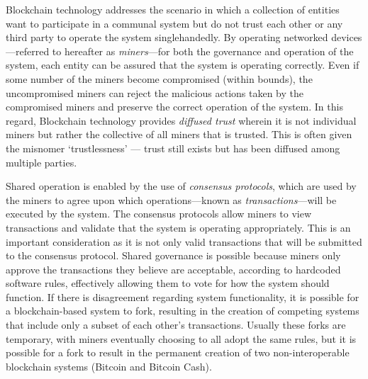 
Blockchain technology addresses the scenario in which a collection of entities want to participate in a communal system but do not trust each other or any third party to operate the  system singlehandedly. By operating networked devices---referred to hereafter as \emph{miners}---for both the governance and operation of the system, each entity can be assured that the system is operating correctly. Even if some number of the miners become compromised (within bounds), the uncompromised miners can reject the malicious actions taken by the compromised miners and preserve the correct operation of the system. In this regard, Blockchain technology provides \emph{diffused trust} wherein it is not individual miners but rather the collective of all miners that is trusted. This is often given the misnomer `trustlessness' --- trust still exists but has been diffused among multiple parties.

Shared operation is enabled by the use of \emph{consensus protocols}, which are used by the miners to agree upon which operations---known as \emph{transactions}---will be executed by the system. The consensus protocols allow miners to view transactions and validate that the 
system is operating appropriately. This is an important consideration as it is not only valid transactions that will be submitted to the consensus protocol. Shared governance is possible because miners  only approve the transactions they believe are acceptable, according to hardcoded software rules, effectively allowing them to vote for how the system should function. If there is disagreement regarding system functionality, it is possible for a blockchain-based system to fork, resulting in the creation of competing systems that include only a subset of each other's transactions. Usually these forks are temporary, with miners eventually choosing to all adopt the same rules, but it is possible for a fork to result in the permanent creation of two non-interoperable blockchain systems (\eg Bitcoin and Bitcoin Cash).

